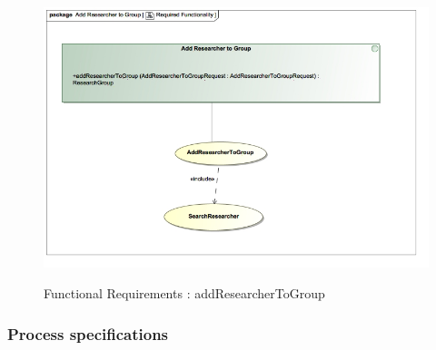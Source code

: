 \documentclass{article}
\begin{document}
		\begin{figure}[H]
			\includegraphics[width=\textwidth]{Vuyani_Diagrams/RequiredFunctionalityAddResearcherToGroup.jpg}  \\
			\caption{Functional Requirements : addResearcherToGroup}
		\end{figure}
	

	\subsubsection{Process specifications}
	
\end{document}
